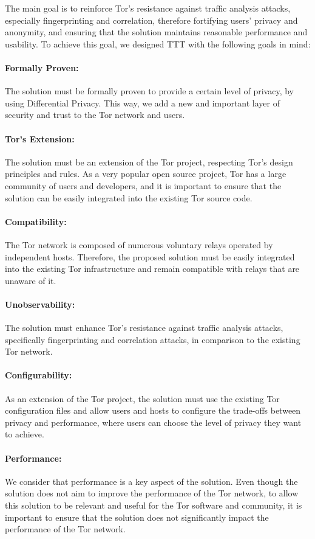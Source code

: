 The main goal is to reinforce Tor's resistance against traffic analysis attacks, especially fingerprinting and correlation, therefore fortifying users' privacy and anonymity, and ensuring that the solution maintains reasonable performance and usability. To achieve this goal, we designed TTT with the following goals in mind:
\paragraph{Formally Proven:} The solution must be formally proven to provide a certain level of privacy, by using Differential Privacy. This way, we add a new and important layer of security and trust to the Tor network and users.
\paragraph{Tor's Extension:} The solution must be an extension of the Tor project, respecting Tor's design principles and rules. As a very popular open source project, Tor has a large community of users and developers, and it is important to ensure that the solution can be easily integrated into the existing Tor source code.
\paragraph{Compatibility:} The Tor network is composed of numerous voluntary relays operated by independent hosts. Therefore, the proposed solution must be easily integrated into the existing Tor infrastructure and remain compatible with relays that are unaware of it.
\paragraph{Unobservability:} The solution must enhance Tor's resistance against traffic analysis attacks, specifically fingerprinting and correlation attacks, in comparison to the existing Tor network. 
\paragraph{Configurability:} As an extension of the Tor project, the solution must use the existing Tor configuration files and allow users and hosts to configure the trade-offs between privacy and performance, where users can choose the level of privacy they want to achieve.
\paragraph{Performance:} We consider that performance is a key aspect of the solution. Even though the solution does not aim to improve the performance of the Tor network, to allow this solution to be relevant and useful for the Tor software and community, it is important to ensure that the solution does not significantly impact the performance of the Tor network. 


